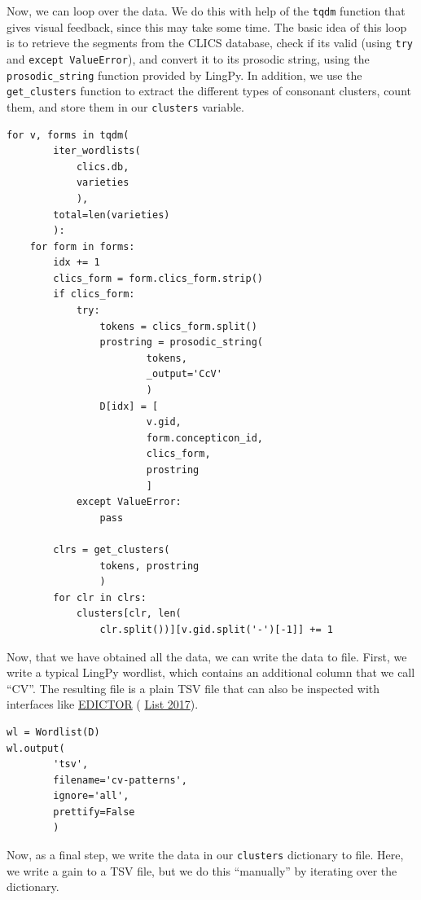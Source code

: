 \documentclass[
  a4paper,
  14pt,
  oneside,
  tablecaptionabove
]{scrbook}
\begin{document}
Now, we can loop over the data. We do this with help of the
\lstinline!tqdm! function that gives visual feedback, since this may
take some time. The basic idea of this loop is to retrieve the segments
from the CLICS database, check if its valid (using \lstinline!try! and
\lstinline!except ValueError!), and convert it to its prosodic string,
using the \lstinline!prosodic_string! function provided by LingPy. In
addition, we use the \lstinline!get_clusters! function to extract the
different types of consonant clusters, count them, and store them in our
\lstinline!clusters! variable.

\begin{lstlisting}[basicstyle=\small]
for v, forms in tqdm(
        iter_wordlists(
            clics.db, 
            varieties
            ), 
        total=len(varieties)
        ):
    for form in forms:
        idx += 1
        clics_form = form.clics_form.strip()
        if clics_form:
            try:
                tokens = clics_form.split()
                prostring = prosodic_string(
                        tokens,
                        _output='CcV'
                        )
                D[idx] = [
                        v.gid, 
                        form.concepticon_id, 
                        clics_form,
                        prostring
                        ]
            except ValueError:
                pass

        clrs = get_clusters(
                tokens, prostring
                )
        for clr in clrs:
            clusters[clr, len(
                clr.split())][v.gid.split('-')[-1]] += 1
\end{lstlisting}

Now, that we have obtained all the data, we can write the data to file.
First, we write a typical LingPy wordlist, which contains an additional
column that we call \enquote{CV}. The resulting file is a plain TSV file
that can also be inspected with interfaces like
\href{http://edictor.digling.org}{EDICTOR} (
\href{http://bibliography.lingpy.org?key=List2017d}{List 2017}).

\begin{lstlisting}[basicstyle=\small]
wl = Wordlist(D)
wl.output(
        'tsv', 
        filename='cv-patterns', 
        ignore='all', 
        prettify=False
        )
\end{lstlisting}

Now, as a final step, we write the data in our \lstinline!clusters!
dictionary to file. Here, we write a gain to a TSV file, but we do this
\enquote{manually} by iterating over the dictionary.
\end{document}
